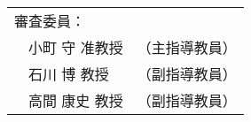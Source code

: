 \newpage
\thispagestyle{empty}
\vspace*{8cm}
\begin{center}


 \bigskip

 \jauthor
 \vspace*{0.4cm}
 \begin{table}[h]
 \begin{center}
	\begin{tabular}[t]{p{}ll}
	 \multicolumn{2}{l}{審査委員：} \\
	 & 小町 守 准教授 & （主指導教員） \\
	 & 石川 博 教授 & （副指導教員） \\
	 & 高間 康史 教授 & （副指導教員）
	\end{tabular}
 \end{center}
 \end{table}
 \end{center}
 
\newpage
